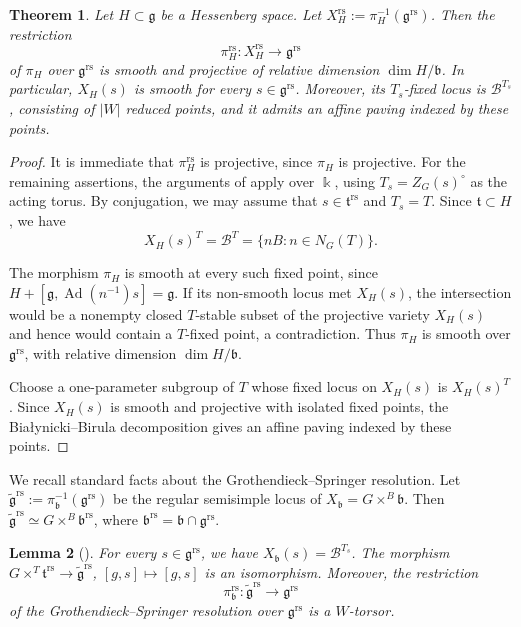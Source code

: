 \documentclass[11pt]{amsart}
\numberwithin{equation}{section}
\newtheorem{theorem}{Theorem}[section]
\newtheorem{lemma}[theorem]{Lemma}
\theoremstyle{definition}
\newcommand\grs{\mathfrak{g}^{\mathrm{rs}}}
\newcommand\tgrs{\widetilde{\mathfrak{g}}^{\mathrm{rs}}}
\newcommand\rs{{\mathrm{rs}}}
\def\lra{\longrightarrow }
\DeclareMathOperator{\Ad}{\mathrm{Ad}}
\def\cB{\mathcal {B}}
\def\fg{\mathfrak {g}}
\def\fb{\mathfrak {b}}
\def\ft{\mathfrak {t}}
\begin{document}
\begin{theorem}\label{thm:DMPS}
	Let $H\subset \fg$ be a Hessenberg space.
	Let $X_H^{\mathrm{rs}}:=\pi_H^{-1}(\grs)$. Then  the restriction 
	\[\pi_H^{\mathrm{rs}}:X_H^{\mathrm{rs}}\lra \grs\]
	of $\pi_H$ over $\grs$ is smooth and projective of relative dimension $\dim H/\fb$.
	In particular, $X_H(s)$ is smooth for every $s\in \grs$. 
	Moreover, its $T_s$-fixed locus is $\cB^{T_s}$, consisting of $\lvert W\rvert$ reduced points, and it admits an affine paving indexed by these points. 
\end{theorem}
\begin{proof}
It is immediate that $\pi_H^\rs$ is projective, since $\pi_H$ is projective. For the remaining assertions, the arguments of \cite[Sections~II--III]{demari-procesi-shayman} apply over $\Bbbk$, using $T_s=Z_G(s)^\circ$ as the acting torus.
By conjugation, we may assume that $s\in\mathfrak t^{\mathrm{rs}}$ and $T_s=T$. 
Since $\mathfrak t\subset H$, we have
\[X_H(s)^T=\cB^T=\{nB:n\in N_G(T)\}.\]

The morphism $\pi_H$ is smooth at every such fixed point, since
$H+[\fg,\Ad(n^{-1})s]=\fg$.
If its non-smooth locus met $X_H(s)$, the intersection would be a nonempty closed $T$-stable subset of the projective variety $X_H(s)$ and hence would contain a $T$-fixed point, a contradiction.
Thus $\pi_H$ is smooth over $\grs$, with relative dimension $\dim H/\fb$.

Choose a one-parameter subgroup of $T$ whose fixed locus on
$X_H(s)$ is $X_H(s)^T$. Since $X_H(s)$ is smooth and projective
with isolated fixed points, the Bia{\l}ynicki--Birula decomposition
gives an affine paving indexed by these points.
\end{proof}


We recall  standard facts about the Grothendieck--Springer resolution. %
Let $\tgrs:=\pi_\fb^{-1}(\grs)$ be the regular semisimple locus of $X_\fb=G\times^B\fb$. Then $\tgrs\simeq G\times^B\fb^{\rs}$, where $\fb^{\rs}=\fb\cap \grs$.

\begin{lemma}[{\cite[Lemmas~13.3--13.4 and Section~13.5]{jantzen-nilpotent}}]\label{lem:W-torsor}
For every $s\in\grs$, we have $X_\fb(s)=\cB^{T_s}$.
The morphism $G\times^T\ft^{\mathrm{rs}}\to\tgrs$,
$[g,s]\mapsto[g,s]$
is an isomorphism.
Moreover, the restriction 
\[\pi_\fb^{\mathrm{rs}}:\tgrs\lra \grs\] 
of the Grothendieck--Springer resolution over $\grs$
is a $W$-torsor.
\end{lemma}
\end{document}

